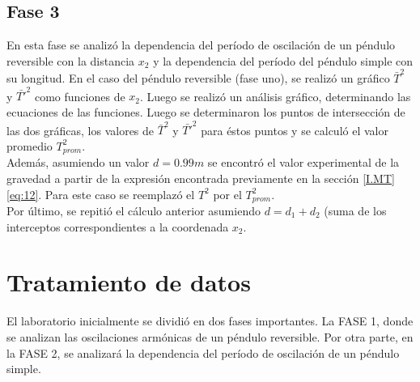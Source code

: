 \documentclass[spanish,notitlepage,letterpaper, 12pt]{article}
\begin{document}
\subsection{Fase 3}
En esta fase se analizó la dependencia del período de oscilación de un
péndulo reversible con la distancia $x_2$ y la dependencia del período del péndulo simple
con su longitud. En el caso del péndulo reversible (fase uno), se realizó un gráfico $\bar{T}^2$ y $\bar{T\prime}^2$ como funciones de $x_2$. Luego se realizó un análisis
gráfico, determinando las ecuaciones de las funciones. Luego se determinaron los puntos de intersección de las dos gráficas, los valores de $\bar{T}^2$ y $\bar{T\prime}^2$ para éstos puntos y se calculó el valor promedio $T_{prom}^2$.\\

Además, asumiendo un valor $d=0.99m$ se encontró el valor experimental de la gravedad a partir de la expresión encontrada previamente en la sección \ref{I.MT} \eqref{eq:12}. Para este caso se reemplazó el $T^2$ por el $T_{prom}^2$.\\

Por último, se repitió el cálculo anterior asumiendo $d=d_1+d_2$ (suma de los
interceptos correspondientes a la coordenada $x_2$.
\section{Tratamiento de datos} \label{TD}
El laboratorio inicialmente se dividió en dos fases importantes. La FASE 1, donde se analizan las oscilaciones armónicas de un péndulo reversible. Por otra parte, en la FASE 2, se analizará la dependencia del período de oscilación de un péndulo simple.
\end{document}
